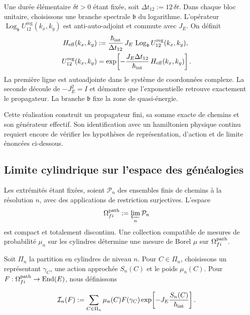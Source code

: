 Une durée élémentaire \(\delta t>0\) étant fixée, soit
\(\Delta t_{12}:=12\,\delta t\). Dans chaque bloc unitaire, choisissons une branche
spectrale \(\mathfrak b\) du logarithme. L’opérateur
\(\operatorname{Log}_{\mathfrak b}U_{12}^{\mathrm{reg}}(k_x,k_y)\) est
anti-auto-adjoint et commute avec \(J_E\). On définit
\begin{equation}
 \begin{aligned}
 H_{\rm eff}(k_x,k_y)
 &:=
 \frac{\hbar_{\rm int}}{\Delta t_{12}}\,
 J_E\,
 \operatorname{Log}_{\mathfrak b}
 U_{12}^{\mathrm{reg}}(k_x,k_y),\\
 U_{12}^{\mathrm{reg}}(k_x,k_y)
 &=
 \exp\!\left[
  -\frac{J_E\Delta t_{12}}{\hbar_{\rm int}}\,
  H_{\rm eff}(k_x,k_y)
 \right].
 \end{aligned}
 \label{eq:hamiltoniano-efectivo-registro-27-rev3}
\end{equation}
La première ligne est autoadjointe dans le système de coordonnées complexe. La seconde découle de
\(-J_E^2=I\) et démontre que l’exponentielle retrouve exactement le
propagateur. La branche \(\mathfrak b\) fixe la zone de quasi-énergie.

Cette réalisation construit un propagateur fini, sa somme exacte de chemins et
son générateur effectif. Son identification avec un hamiltonien physique continu
requiert encore de vérifier les hypothèses de représentation, d’action et de limite
énoncées ci-dessous.


\subsection{Limite cylindrique sur l’espace des généalogies}

Les extrémités étant fixées, soient \(\mathcal P_n\) des ensembles finis de chemins à la
résolution \(n\), avec des applications de restriction surjectives. L’espace
\[
 \Omega^{\rm path}_{fi}:=\varprojlim_n\mathcal P_n
\]
est compact et totalement discontinu. Une collection compatible de mesures
de probabilité \(\mu_n\) sur les cylindres détermine une mesure de Borel
\(\mu\) sur \(\Omega^{\rm path}_{fi}\).

Soit \(\Pi_n\) la partition en cylindres de niveau \(n\). Pour
\(C\in\Pi_n\), choisissons un représentant \(\gamma_C\), une action approchée
\(S_n(C)\) et le poids \(\mu_n(C)\). Pour
\(F:\Omega^{\rm path}_{fi}\to\operatorname{End}(E)\), nous définissons

\begin{equation}
 \mathcal I_n(F)
 :=\sum_{C\in\Pi_n}\mu_n(C)F(\gamma_C)
 \exp\!\left[-J_E\frac{S_n(C)}{\hbar_{\rm int}}\right].
 \label{eq:integral-cilindrica-aproximante-rev2}
\end{equation}

